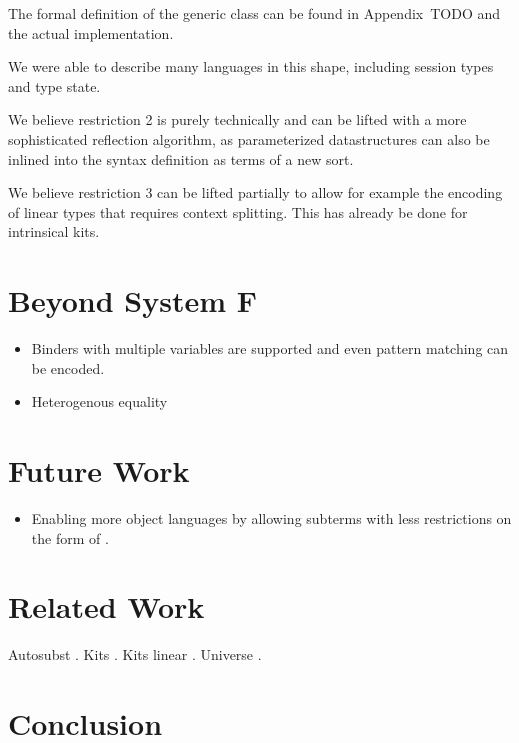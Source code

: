 \documentclass[sigplan,10pt, anonymous]{acmart}
\newcommand*\ACode[1]{\AgdaFontStyle{\textcolor{mygray}{#1}}}
\begin{document}
  The formal definition of the generic class can be found in
  Appendix~TODO and the actual implementation.

  We were able to describe many languages in this shape, including
  session types and type state.

  We believe restriction 2 is purely technically and can be lifted
  with a more sophisticated reflection algorithm, as parameterized
  datastructures can also be inlined into the syntax definition as terms
  of a new sort.

  We believe restriction 3 can be lifted partially to allow for
  example the encoding of linear types that requires context
  splitting. This has already be done for intrinsical kits\cite{TODO}.


  \section{Beyond System F}
  \begin{itemize}
  \item
    Binders with multiple variables are supported and even pattern
    matching can be encoded.
  \item
    Heterogenous equality
  \end{itemize}

  \section{Future Work}
  \begin{itemize}
  \item
    Enabling more object languages by allowing subterms with less
    restrictions on the form of \ACode{S}.
  \end{itemize}

  \section{Related Work}
  Autosubst \cite{DBLP:conf/cpp/StarkSK19, DBLP:conf/itp/SchaferTS15}.
  Kits \cite{DBLP:journals/jar/BentonHKM12, unpublished:mcbride2005kits}.
  Kits linear \cite{DBLP:journals/corr/abs-2005-02247}.
  Universe \cite{DBLP:journals/pacmpl/AllaisA0MM18}.

  \section{Conclusion}

  

  \clearpage
  \appendix
\end{document}
